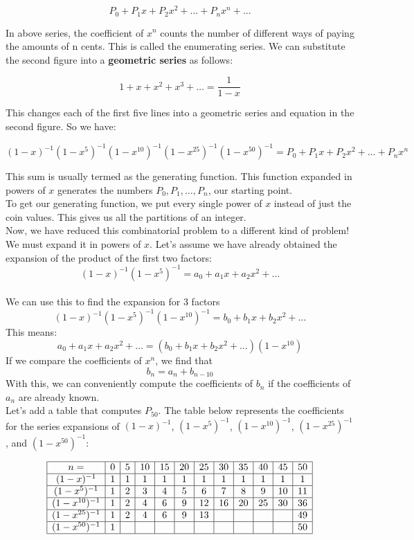 \documentclass{article}
\begin{document}
\[
P_0 + P_1 x + P_2 x^2 + \dots + P_n x^n + \dots
\]

\noindent In above series, the coefficient of \(x^n\) counts the number of different ways of paying the amounts of n cents. This is called the enumerating series. We can substitute the second figure into a \textbf{geometric series} as follows:

\[
1 + x + x^2 + x^3 + \dots = \frac{1}{1-x}
\]

\noindent This changes each of the first five lines into a geometric series and equation in the second figure. So we have:

\[
(1 - x)^{-1}(1 - x^5)^{-1}(1 - x^{10})^{-1}(1 - x^{25})^{-1}(1 - x^{50})^{-1} = P_0 + P_1 x + P_2 x^2 + \dots + P_n x^n
\]

\noindent This sum is usually termed as the generating function. This function expanded in powers of \(x\) generates the numbers \(P_0, P_1, \dots, P_n\), our starting point. \\

\noindent To get our generating function, we put every single power of \(x\) instead of just the coin values. This gives us all the partitions of an integer. \\

\noindent Now, we have reduced this combinatorial problem to a different kind of problem! We must expand it in powers of \(x\). Let's assume we have already obtained the expansion of the product of the first two factors:
\[
(1 - x)^{-1}(1 - x^5)^{-1} = a_0 + a_1 x + a_2 x^2 + \dots
\] \\

\noindent  We can use this to find the expansion for 3 factors
\[
(1 - x)^{-1}(1 - x^5)^{-1}(1 - x^{10})^{-1} = b_0 + b_1 x + b_2 x^2 + \dots
\]
This means:
\[
a_0 + a_1 x + a_2 x^2 + \dots = (b_0 + b_1 x + b_2 x^2 + \dots)(1 - x^{10})
\]
If we compare the coefficients of $x^n$, we find that
\[
b_n = a_n + b_{n-10}
\]
With this, we can conveniently compute the coefficients of $b_n$ if the coefficients of $a_n$ are already known. \\

\noindent Let's add a table that computes $P_{50}$. The table below represents the coefficients for the series expansions of $(1-x)^{-1}$, $(1-x^5)^{-1}$, $(1-x^{10})^{-1}$, $(1-x^{25})^{-1}$, and $(1-x^{50})^{-1}$: 

\[
\begin{array}{|c|*{11}{c|}}
\hline
n = & 0 & 5 & 10 & 15 & 20 & 25 & 30 & 35 & 40 & 45 & 50 \\
\hline
(1 - x)^{-1} & 1 & 1 & 1 & 1 & 1 & 1 & 1 & 1 & 1 & 1 & 1 \\
\hline
(1 - x^5)^{-1} & 1 & 2 & 3 & 4 & 5 & 6 & 7 & 8 & 9 & 10 & 11 \\
\hline
(1 - x^{10})^{-1} & 1 & 2 & 4 & 6 & 9 & 12 & 16 & 20 & 25 & 30 & 36 \\
\hline
(1 - x^{25})^{-1} & 1 & 2 & 4 & 6 & 9 & 13 &  &  &  &  & 49 \\
\hline
(1 - x^{50})^{-1} & 1 &  &  &  &  &  &  &  &  &  & 50 \\
\hline
\end{array}
\]
\end{document}
